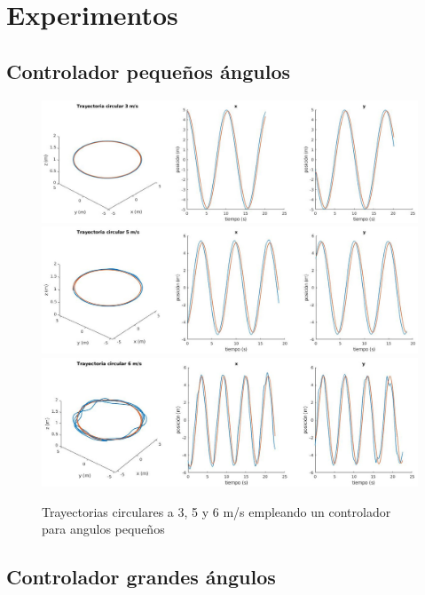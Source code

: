 \chapter{Experimentos}

\section{Controlador pequeños ángulos}
\begin{figure}[htb!]
	\centering
	\includegraphics[width=\textwidth]{imagenes/circle3ms}
	\includegraphics[width=\textwidth]{imagenes/circle5ms}
	\includegraphics[width=\textwidth]{imagenes/circle6ms}
	\caption{Trayectorias circulares a 3, 5 y 6 m/s empleando un controlador para angulos pequeños}
	\label{circle:slow}
\end{figure}
\section{Controlador grandes  ángulos}

